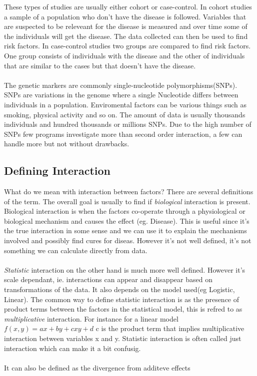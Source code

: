 \documentclass[10pt,a4paper]{article}
\begin{document}
These types of studies are usually either cohort or case-control. In cohort studies a sample of a population who don't have the disease is followed. Variables that are suspected to be releveant for the disease is measured and over time some of the individuals will get the disease. The data collected can then be used to find risk factors. In case-control studies two groups are compared to find risk factors. One group consists of individuals with the disease and the other of individuals that are similar to the cases but that doesn't have the disease. \cite{rothman1998modern,mann_observational}\\
\\
The genetic markers are commonly single-nucleotide polymorphisms(SNPs). SNPs are variations in the genome where a single Nucleotide differs between individuals in a population\cite{fareed_snp}. Enviromental factors can be various things such as smoking, physical activity and so on. The amount of data is usually thousands individuals and hundred thousands or millions SNPs. Due to the high number of SNPs few programs investigate more than second order interaction, a few can handle more but not without drawbacks\cite{gwis,high_order_2012,fast_high_order_cluster}.


\subsection{Defining Interaction}
What do we mean with interaction between factors? There are several definitions of the term\cite{rothman2002intro_epidemiology}. The overall goal is usually to find if \emph{biological} interaction is present. Biological interaction is when the factors co-operate through a physiological or biological mechanism and causes the effect (eg. Disease). This is useful since it's the true interaction in some sense and we can use it to explain the mechanisms involved and possibly find cures for diseas. However it's not well defined, it's not something we can calculate directly from data.\cite{rothman1998modern,rothman2002intro_epidemiology}\\
\\
\emph{Statistic} interaction on the other hand is much more well defined. However it's scale dependant, ie. interactions can appear and disappear based on transformations of the data. It also depends on the model used(eg Logistic, Linear). The common way to define statistic interaction is as the presence of product terms between the factors in the statistical model, this is refred to as \emph{multiplicative} interaction. For instance for a linear model $f(x,y)=ax+by+cxy+d$ c is the product term that implies multiplicative interaction between variables x and y. Statistic interaction is often called just interaction which can make it a  bit confusig.\cite{geira,rothman1998modern}\\
\\
It can also be defined as the divergence from additeve effects
\end{document}
